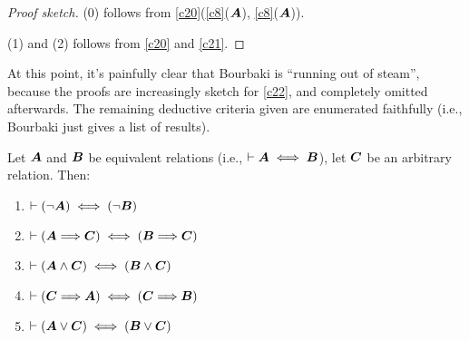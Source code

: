 \begin{proof}[Proof sketch]
(0) follows from \ref{c20}(\ref{c8}($\boldsymbol{A}$), \ref{c8}($\boldsymbol{A}$)).

(1) and (2) follows from \ref{c20} and \ref{c21}.
\end{proof}

At this point, it's painfully clear that Bourbaki is ``running out of steam'',
because the proofs are increasingly sketch for \ref{c22}, and completely
omitted afterwards. The remaining deductive criteria given are
enumerated faithfully (i.e., Bourbaki just gives a list of results).

\begin{dc}\label{c23}
Let $\boldsymbol{A}$ and $\boldsymbol{B}$ be equivalent relations
(i.e., $\vdash\boldsymbol{A}\iff\boldsymbol{B}$), let
$\boldsymbol{C}$ be an arbitrary relation. Then:
\begin{enumerate}
\item $\vdash(\neg\boldsymbol{A})\iff(\neg\boldsymbol{B})$
\item $\vdash(\boldsymbol{A}\Longrightarrow\boldsymbol{C})\iff(\boldsymbol{B}\Longrightarrow\boldsymbol{C})$
\item $\vdash(\boldsymbol{A}\land\boldsymbol{C})\iff(\boldsymbol{B}\land\boldsymbol{C})$
\item $\vdash(\boldsymbol{C}\Longrightarrow\boldsymbol{A})\iff(\boldsymbol{C}\Longrightarrow\boldsymbol{B})$
\item $\vdash(\boldsymbol{A}\lor\boldsymbol{C})\iff(\boldsymbol{B}\lor\boldsymbol{C})$
\end{enumerate}
\end{dc}

